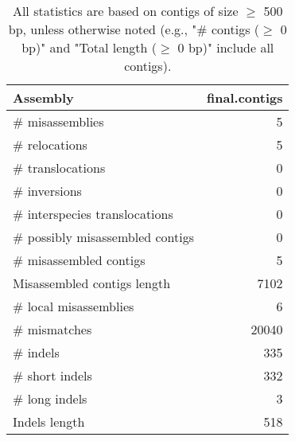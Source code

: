 \documentclass[12pt,a4paper]{article}
\begin{document}
\begin{table}[ht]
\begin{center}
\caption{All statistics are based on contigs of size $\geq$ 500 bp, unless otherwise noted (e.g., "\# contigs ($\geq$ 0 bp)" and "Total length ($\geq$ 0 bp)" include all contigs).}
\begin{tabular}{|l*{1}{|r}|}
\hline
Assembly & final.contigs \\ \hline
\# misassemblies & 5 \\ \hline
\hspace{5mm}\# relocations & 5 \\ \hline
\hspace{5mm}\# translocations & 0 \\ \hline
\hspace{5mm}\# inversions & 0 \\ \hline
\hspace{5mm}\# interspecies translocations & 0 \\ \hline
\# possibly misassembled contigs & 0 \\ \hline
\# misassembled contigs & 5 \\ \hline
Misassembled contigs length & 7102 \\ \hline
\# local misassemblies & 6 \\ \hline
\# mismatches & 20040 \\ \hline
\# indels & 335 \\ \hline
\hspace{5mm}\# short indels & 332 \\ \hline
\hspace{5mm}\# long indels & 3 \\ \hline
Indels length & 518 \\ \hline
\end{tabular}
\end{center}
\end{table}
\end{document}
